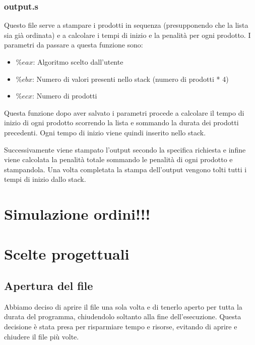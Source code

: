 \documentclass[a4paper]{article}
\begin{document}
\subsubsection{output.s}
\label{output}
Questo file serve a stampare i prodotti in sequenza (presupponendo che la lista sia già
ordinata) e a calcolare i tempi di inizio e la penalità per ogni prodotto. I parametri
da passare a questa funzione sono:
\begin{itemize}
	\item \( \%eax \): Algoritmo scelto dall'utente
	\item \( \%ebx \): Numero di valori presenti nello stack (numero di prodotti * 4)
	\item \( \%ecx \): Numero di prodotti
\end{itemize}
Questa funzione dopo aver salvato i parametri procede a calcolare il tempo di inizio
di ogni prodotto scorrendo la lista e sommando la durata dei prodotti precedenti. Ogni
tempo di inizio viene quindi inserito nello stack.

\noindent Successivamente viene stampato l'output secondo la specifica richiesta e infine
viene calcolata la penalità totale sommando le penalità di ogni prodotto e stampandola.
Una volta completata la stampa dell'output vengono tolti tutti i tempi di inizio dallo
stack.


\section{Simulazione ordini!!!}
\section{Scelte progettuali}
\subsection{Apertura del file}
Abbiamo deciso di aprire il file una sola volta e di tenerlo aperto per tutta la durata
del programma, chiudendolo soltanto alla fine dell'esecuzione. Questa decisione è stata
presa per risparmiare tempo e risorse, evitando di aprire e chiudere il file più volte.
\end{document}
